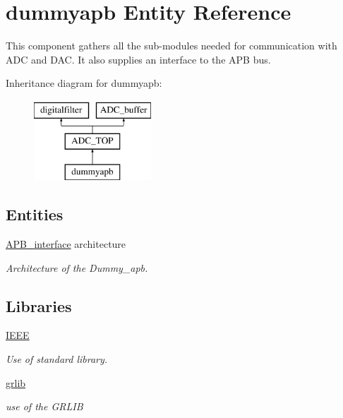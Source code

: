 \hypertarget{classdummyapb}{\section{dummyapb Entity Reference}
\label{classdummyapb}
}


This component gathers all the sub-\/modules needed for communication with A\-D\-C and D\-A\-C. It also supplies an interface to the A\-P\-B bus.  


Inheritance diagram for dummyapb\-:\begin{figure}[H]
\begin{center}
\leavevmode
\includegraphics[height=3.000000cm]{classdummyapb}
\end{center}
\end{figure}
\subsection*{Entities}
\begin{DoxyCompactItemize}
\item 
\hyperlink{classdummyapb_1_1APB__interface}{A\-P\-B\-\_\-interface} architecture
\begin{DoxyCompactList}\small\item\em Architecture of the Dummy\-\_\-apb. \end{DoxyCompactList}\end{DoxyCompactItemize}
\subsection*{Libraries}
 \begin{DoxyCompactItemize}
\item 
\hypertarget{classdummyapb_ae4f03c286607f3181e16b9aa12d0c6d4}{\hyperlink{classdummyapb_ae4f03c286607f3181e16b9aa12d0c6d4}{I\-E\-E\-E} }\label{classdummyapb_ae4f03c286607f3181e16b9aa12d0c6d4}

\begin{DoxyCompactList}\small\item\em Use of standard library. \end{DoxyCompactList}\item 
\hypertarget{classdummyapb_a2306e6b22fb33ca087d2f1b289b10e28}{\hyperlink{classdummyapb_a2306e6b22fb33ca087d2f1b289b10e28}{grlib} }\label{classdummyapb_a2306e6b22fb33ca087d2f1b289b10e28}

\begin{DoxyCompactList}\small\item\em use of the G\-R\-L\-I\-B \end{DoxyCompactList}\end{DoxyCompactItemize}

